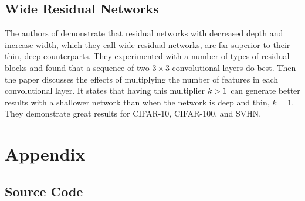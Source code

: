 \documentclass{IEEEtran}
\newcommand{\gt}{\symbol{"3E}}
\begin{document}
\subsection{Wide Residual Networks}
The authors of \cite{Zagoruyko_2016} demonstrate that residual networks
\cite{He_2016_CVPR} with decreased depth and increase width, which they call
wide residual networks, are far superior to their thin, deep counterparts. They
experimented with a number of types of residual blocks and found that a sequence
of two \(3\times 3\) convolutional layers do best. Then the paper discusses the
effects of multiplying the number of features in each convolutional layer. It
states that having this multiplier \(k\gt 1\) can generate better results with a
shallower network than when the network is deep and thin, \(k = 1\). They
demonstrate great results for CIFAR-10, CIFAR-100, and SVHN.


\section{Appendix}
\subsection{Source Code}











\end{document}
